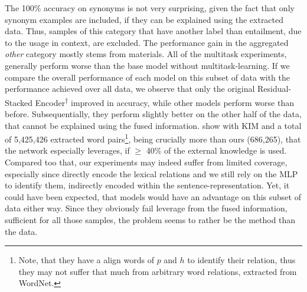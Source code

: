 The 100\% accuracy on synonyms is not very surprising, given the fact that only synonym examples are included, if they can be explained using the extracted data. Thus, samples of this category that have another label than entailment, due to the usage in context, are excluded. The performance gain in the aggregated \textit{other} category mostly stems from materials. All of the multitask experiments, generally perform worse than the base model without multitask-learning. If we compare the overall performance of each model on this subset of data with the performance achieved over all data, we observe that only the original Residual-Stacked Encoder\textsuperscript{$\dagger$} improved in accuracy, while other models perform worse than before. Subsequentially, they perform slightly better on the other half of the data, that cannot be explained using the fused information. \cite{chen2017natural} show with \ac{KIM} and a total of 5,425,426 extracted word pairs\footnote{Note, that they have a align words of $p$ and $h$ to identify their relation, thus they may not suffer that much from arbitrary word relations, extracted from WordNet.}, being crucially more than ours (686,265), that the network especially leverages, if $\geq$ 40\% of the external knowledge is used. Compared too that, our experiments may indeed suffer from limited coverage, especially since \cite{chen2017natural} directly encode the lexical relations and we still rely on the \ac{MLP} to identify them, indirectly encoded within the sentence-representation. Yet, it could have been expected, that models would have an advantage on this subset of data either way. Since they obviously fail leverage from the fused information, sufficient for all those samples, the problem seems to rather be the method than the data.

